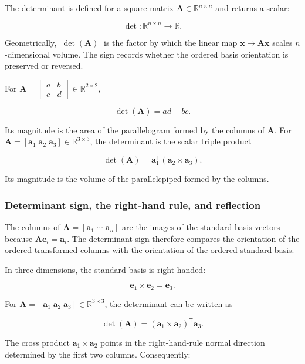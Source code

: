 \documentclass[
  australian,
  12pt,
  letterpaper,
  DIV=11,
  numbers=noendperiod,
  twoside]{scrreprt}
\begin{document}
The determinant is defined for a square matrix
\(\mathbf A\in\mathbb R^{n\times n}\) and returns a scalar:

\[
\det:\mathbb R^{n\times n}\rightarrow\mathbb R.
\]

Geometrically, \(|\det(\mathbf A)|\) is the factor by which the linear
map \(\mathbf x\mapsto\mathbf A\mathbf x\) scales \(n\)-dimensional
volume. The sign records whether the ordered basis orientation is
preserved or reversed.

For
\(\mathbf A=\begin{bmatrix}a&b\\c&d\end{bmatrix}\in\mathbb R^{2\times2}\),

\[
\det(\mathbf A)=ad-bc.
\]

Its magnitude is the area of the parallelogram formed by the columns of
\(\mathbf A\). For
\(\mathbf A=[\mathbf a_1\;\mathbf a_2\;\mathbf a_3]\in\mathbb R^{3\times3}\),
the determinant is the scalar triple product

\[
\det(\mathbf A)
=
\mathbf a_1^{\mathsf T}(\mathbf a_2\times\mathbf a_3).
\]

Its magnitude is the volume of the parallelepiped formed by the columns.

\subsubsection{Determinant sign, the right-hand rule, and
reflection}\label{determinant-sign-the-right-hand-rule-and-reflection}

The columns of \(\mathbf A=[\mathbf a_1\;\cdots\;\mathbf a_n]\) are the
images of the standard basis vectors because
\(\mathbf A\mathbf e_i=\mathbf a_i\). The determinant sign therefore
compares the orientation of the ordered transformed columns with the
orientation of the ordered standard basis.

In three dimensions, the standard basis is right-handed:

\[
\mathbf e_1\times\mathbf e_2=\mathbf e_3.
\]

For
\(\mathbf A=[\mathbf a_1\;\mathbf a_2\;\mathbf a_3]\in\mathbb R^{3\times3}\),
the determinant can be written as

\[
\det(\mathbf A)
=
(\mathbf a_1\times\mathbf a_2)^{\mathsf T}\mathbf a_3.
\]

The cross product \(\mathbf a_1\times\mathbf a_2\) points in the
right-hand-rule normal direction determined by the first two columns.
Consequently:
\end{document}
